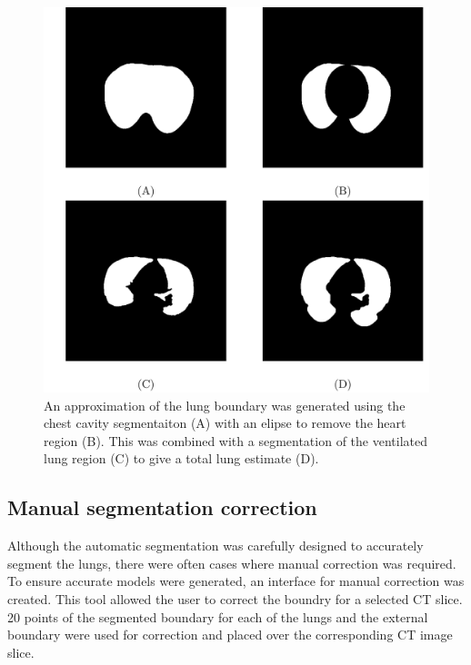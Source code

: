\begin{figure}
	\centering
	\includegraphics[width=\textwidth]{chapter5-CT_to_mesh/imgs/lung_seg_methods.pdf}
	\caption[Lung segmentation methods.]{\label{fig:lung_seg_methods}%
	An approximation of the lung boundary was generated using the chest cavity segmentaiton
	(A) with an elipse to remove the heart region (B).
	This was combined with a segmentation of the ventilated lung region (C) 
	to give a total lung estimate (D).
	}
\end{figure}

\subsection{Manual segmentation correction}  \label{sec:correct-segment}
Although the automatic segmentation was carefully designed to accurately segment the 
lungs, there were often cases where manual correction was required. To ensure accurate
models were generated, an interface for manual correction was created. 
This tool allowed the user to correct the boundry for a selected CT slice. 
20 points of the segmented boundary for each of the lungs and the external 
boundary were used for correction and placed over 
the corresponding CT image slice.

